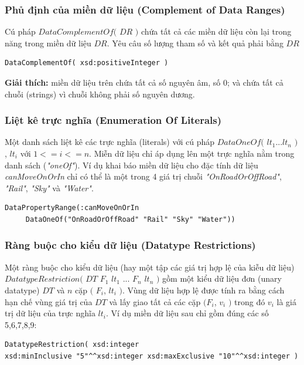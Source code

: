 \subsubsection{Phủ định của miền dữ liệu (Complement of Data Ranges)}
Cú pháp $DataComplementOf($ $DR$ $)$ chứa tất cả các miền dữ liệu còn lại trong năng trong miền dữ liệu $DR$. Yêu câu số lượng tham số và kết quả phải bằng $DR$
\begin{verbatim}
DataComplementOf( xsd:positiveInteger )
\end{verbatim}
\textbf{Giải thích:} miền dữ liệu trên chứa tất cả số nguyên âm, số 0; và chứa tất cả chuỗi (strings) vì chuỗi không phải số nguyên dương.

\subsubsection{Liệt kê trực nghĩa (Enumeration Of Literals)}
Một danh sách liệt kê các trực nghĩa (literals) với cú pháp $DataOneOf($ $lt_{1} ... lt_{n}$ $)$,  $lt_{i}$ với $1 <= i <= n$.  Miễn dữ liệu chỉ áp dụng lên một trực nghĩa nằm trong danh sách (\textit{"oneOf"}). Ví dụ khai báo miền dữ liệu cho đặc tính dữ liệu \textit{canMoveOnOrIn} chỉ có thể là một trong 4 giá trị chuỗi \textit{"OnRoadOrOffRoad"}, \textit{"Rail"}, \textit{"Sky"} và \textit{"Water"}.
\begin{verbatim}
DataPropertyRange(:canMoveOnOrIn 
     DataOneOf("OnRoadOrOffRoad" "Rail" "Sky" "Water"))
\end{verbatim}

\subsubsection{Ràng buộc cho kiểu dữ liệu (Datatype Restrictions)}
Một ràng buộc cho kiểu dữ liệu (hay một tập các giá trị hợp lệ của kiễu dữ liệu) $DatatypeRestriction($ $DT$ $F_{1}$ $lt_{1}$ ... $F_{n}$ $lt_{n}$ $)$ gồm một kiểu dữ liệu đơn (unary datatype) $DT$ và $n$ cặp $($ $F_{i}$, $lt_{i}$ $)$. Vùng dữ liệu hợp lệ được tính ra bằng cách hạn chế vùng giá trị của $DT$ và lấy giao tất cả các cặp $(F_{i}$, $v_{i}$ $)$ trong đó $v_{i}$ là giá trị dữ liệu của trực nghĩa $lt_{i}$. Ví dụ miền dữ liệu sau chỉ gồm đúng các số 5,6,7,8,9:
\begin{verbatim}
DatatypeRestriction( xsd:integer 
xsd:minInclusive "5"^^xsd:integer xsd:maxExclusive "10"^^xsd:integer )
\end{verbatim}

